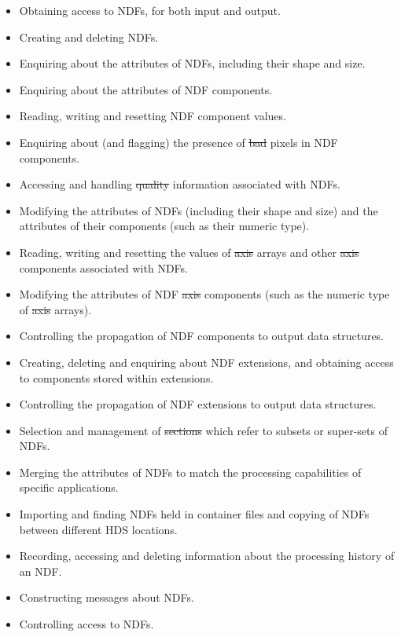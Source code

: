 \begin{itemize}
\item
Obtaining access to NDFs, for both input and output.

\item
Creating and deleting NDFs.

\item
Enquiring about the attributes of NDFs, including their shape and size.

\item
Enquiring about the attributes of NDF components. 

\item
Reading, writing and resetting NDF component values.

\item
Enquiring about (and flagging) the presence of \st{bad\/} pixels in NDF
components.

\item
Accessing and handling \st{quality\/} information associated with NDFs.

\item
Modifying the attributes of NDFs (including their shape and size) and the
attributes of their components (such as their numeric type). 

\item
Reading, writing and resetting the values of \st{axis\/} arrays and other
\st{axis\/} components associated with NDFs. 

\item
Modifying the attributes of NDF \st{axis} components (such as the numeric
type of \st{axis\/} arrays). 

\item
Controlling the propagation of NDF components to output data structures.

\item
Creating, deleting and enquiring about NDF extensions, and obtaining access
to components stored within extensions. 

\item
Controlling the propagation of NDF extensions to output data structures. 

\item
Selection and management of \st{sections\/} which refer to subsets or 
super-sets of NDFs.

\item
Merging the attributes of NDFs to match the processing capabilities of 
specific applications.

\item
Importing and finding NDFs held in  container files
and copying of NDFs between different HDS locations.

\item
Recording, accessing and deleting information about the processing
history of an NDF.

\item
Constructing messages about NDFs.

\item
Controlling access to NDFs.

\end{itemize}

